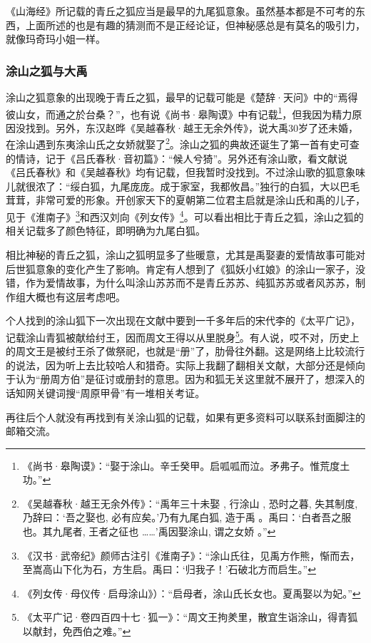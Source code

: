 \documentclass[UTF8, 12pt, A4paper]{article}
\begin{document}
《山海经》所记载的青丘之狐应当是最早的九尾狐意象。虽然基本都是不可考的东西，上面所述的也是有趣的猜测而不是正经论证，但神秘感总是有莫名的吸引力，就像玛奇玛小姐一样。

\subsubsection{涂山之狐与大禹}

涂山之狐意象的出现晚于青丘之狐，最早的记载可能是《楚辞·天问》中的“焉得彼山女，而通之於台桑？”，也有说《尚书·皋陶谟》中有记载\footnote{《尚书·皋陶谟》：“娶于涂山。辛壬癸甲。启呱呱而泣。矛弗子。惟荒度土功。”}，但我因为精力原因没找到。另外，东汉赵晔《吴越春秋·越王无余外传》，说大禹30岁了还未婚，在涂山遇到东夷涂山氏之女娇就娶了\footnote{《吴越春秋·越王无余外传》：“禹年三十未娶 , 行涂山 , 恐时之暮, 失其制度, 乃辞曰：‘吾之娶也, 必有应矣。’乃有九尾白狐, 造于禹 。禹曰：‘白者吾之服也。其九尾者, 王者之征也 ……’禹因娶涂山, 谓之女娇 。” }。涂山之狐的典故还诞生了第一首有史可查的情诗，记于《吕氏春秋·音初篇》：“候人兮猗”。另外还有涂山歌，看文献说《吕氏春秋》和《吴越春秋》均有记载，但我暂时没找到。不过涂山歌的狐意象味儿就很浓了：“绥白狐，九尾庞庞。成于家室，我都攸昌。”独行的白狐，大以巴毛茸茸，非常可爱的形象。开创家天下的夏朝第二位君主启就是涂山氏和禹的儿子，见于《淮南子》\footnote{《汉书·武帝纪》颜师古注引《淮南子》：“涂山氏往，见禹方作熊，惭而去，至嵩高山下化为石，方生启。禹曰：‘归我子！’石破北方而启生。”}和西汉刘向《列女传》\footnote{《列女传·母仪传·启母涂山》）：“启母者，涂山氏长女也。夏禹娶以为妃。”}。可以看出相比于青丘之狐，涂山之狐的相关记载多了颜色特征，即明确为九尾白狐。

相比神秘的青丘之狐，涂山之狐明显多了些暖意，尤其是禹娶妻的爱情故事可能对后世狐意象的变化产生了影响。肯定有人想到了《狐妖小红娘》的涂山一家子，没错，作为爱情故事，为什么叫涂山苏苏而不是青丘苏苏、纯狐苏苏或者风苏苏，制作组大概也有这层考虑吧。

个人找到的涂山狐下一次出现在文献中要到一千多年后的宋代李的《太平广记》，记载涂山青狐被献给纣王，因而周文王得以从里脱身\footnote{《太平广记·卷四百四十七·狐一》：“周文王拘羑里，散宜生诣涂山，得青狐以献封，免西伯之难。”}。有人说，哎不对，历史上的周文王是被纣王杀了做祭祀，也就是“册”了，肋骨往外翻。这是网络上比较流行的说法，因为听上去比较哈人和猎奇。实际上我翻了翻相关文献，大部分还是倾向于认为“册周方伯”是征讨或册封的意思。因为和狐无关这里就不展开了，想深入的话知网关键词搜“周原甲骨”有一堆相关考证。


再往后个人就没有再找到有关涂山狐的记载，如果有更多资料可以联系封面脚注的邮箱交流。
\end{document}
